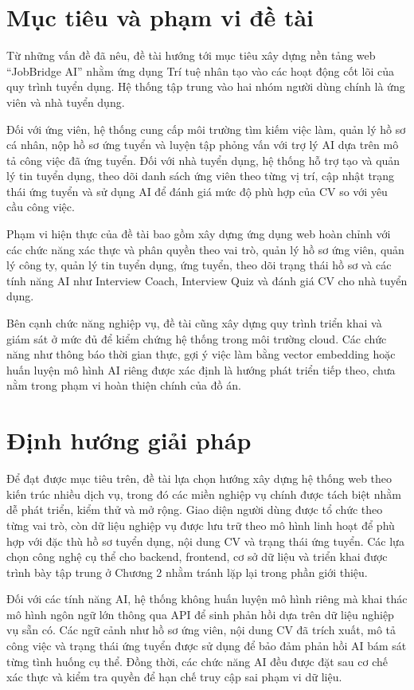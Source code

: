 \documentclass[../DoAn.tex]{subfiles}
\begin{document}
\section{Mục tiêu và phạm vi đề tài}
\label{section:1.2}
Từ những vấn đề đã nêu, đề tài hướng tới mục tiêu xây dựng nền tảng web ``JobBridge AI'' nhằm ứng dụng Trí tuệ nhân tạo vào các hoạt động cốt lõi của quy trình tuyển dụng. Hệ thống tập trung vào hai nhóm người dùng chính là ứng viên và nhà tuyển dụng.

Đối với ứng viên, hệ thống cung cấp môi trường tìm kiếm việc làm, quản lý hồ sơ cá nhân, nộp hồ sơ ứng tuyển và luyện tập phỏng vấn với trợ lý AI dựa trên mô tả công việc đã ứng tuyển. Đối với nhà tuyển dụng, hệ thống hỗ trợ tạo và quản lý tin tuyển dụng, theo dõi danh sách ứng viên theo từng vị trí, cập nhật trạng thái ứng tuyển và sử dụng AI để đánh giá mức độ phù hợp của CV so với yêu cầu công việc.

Phạm vi hiện thực của đề tài bao gồm xây dựng ứng dụng web hoàn chỉnh với các chức năng xác thực và phân quyền theo vai trò, quản lý hồ sơ ứng viên, quản lý công ty, quản lý tin tuyển dụng, ứng tuyển, theo dõi trạng thái hồ sơ và các tính năng AI như Interview Coach, Interview Quiz và đánh giá CV cho nhà tuyển dụng.

Bên cạnh chức năng nghiệp vụ, đề tài cũng xây dựng quy trình triển khai và giám sát ở mức đủ để kiểm chứng hệ thống trong môi trường cloud. Các chức năng như thông báo thời gian thực, gợi ý việc làm bằng vector embedding hoặc huấn luyện mô hình AI riêng được xác định là hướng phát triển tiếp theo, chưa nằm trong phạm vi hoàn thiện chính của đồ án.

\section{Định hướng giải pháp}
\label{section:1.3}
Để đạt được mục tiêu trên, đề tài lựa chọn hướng xây dựng hệ thống web theo kiến trúc nhiều dịch vụ, trong đó các miền nghiệp vụ chính được tách biệt nhằm dễ phát triển, kiểm thử và mở rộng. Giao diện người dùng được tổ chức theo từng vai trò, còn dữ liệu nghiệp vụ được lưu trữ theo mô hình linh hoạt để phù hợp với đặc thù hồ sơ tuyển dụng, nội dung CV và trạng thái ứng tuyển. Các lựa chọn công nghệ cụ thể cho backend, frontend, cơ sở dữ liệu và triển khai được trình bày tập trung ở Chương 2 nhằm tránh lặp lại trong phần giới thiệu.

Đối với các tính năng AI, hệ thống không huấn luyện mô hình riêng mà khai thác mô hình ngôn ngữ lớn thông qua API để sinh phản hồi dựa trên dữ liệu nghiệp vụ sẵn có. Các ngữ cảnh như hồ sơ ứng viên, nội dung CV đã trích xuất, mô tả công việc và trạng thái ứng tuyển được sử dụng để bảo đảm phản hồi AI bám sát từng tình huống cụ thể. Đồng thời, các chức năng AI đều được đặt sau cơ chế xác thực và kiểm tra quyền để hạn chế truy cập sai phạm vi dữ liệu.
\end{document}
